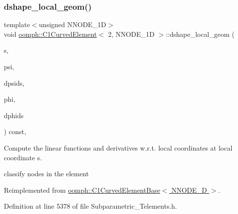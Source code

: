 \subsubsection{\texorpdfstring{dshape\+\_\+local\+\_\+geom()}{dshape\_local\_geom()}}
{\footnotesize\ttfamily template$<$unsigned N\+N\+O\+D\+E\+\_\+1D$>$ \\
void \hyperlink{classoomph_1_1C1CurvedElement}{oomph\+::\+C1\+Curved\+Element}$<$ 2, N\+N\+O\+D\+E\+\_\+1D $>$\+::dshape\+\_\+local\+\_\+geom (\begin{DoxyParamCaption}\item[{const \hyperlink{classoomph_1_1Vector}{Vector}$<$ double $>$ \&}]{s,  }\item[{\hyperlink{classoomph_1_1Shape}{Shape} \&}]{psi,  }\item[{\hyperlink{classoomph_1_1DShape}{D\+Shape} \&}]{dpsids,  }\item[{\hyperlink{classoomph_1_1Shape}{Shape} \&}]{phi,  }\item[{\hyperlink{classoomph_1_1DShape}{D\+Shape} \&}]{dphids }\end{DoxyParamCaption}) const\hspace{0.3cm}{\ttfamily [inline]}, {\ttfamily [virtual]}}



Compute the linear functions and derivatives w.\+r.\+t. local coordinates at local coordinate s. 

classify nodes in the element 

Reimplemented from \hyperlink{classoomph_1_1C1CurvedElementBase_a73eff2b9d4873234465778f53bbeaec8}{oomph\+::\+C1\+Curved\+Element\+Base$<$ N\+N\+O\+D\+E\+\_\+D $>$}.



Definition at line 5378 of file Subparametric\+\_\+\+Telements.\+h.

\mbox{\label{classoomph_1_1C1CurvedElement_3_012_00_01NNODE__1D_01_4_a584224d462537606568ccc4fd6d0b21a}} 
